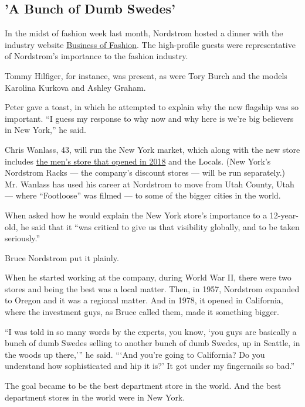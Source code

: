 \hypertarget{a-bunch-of-dumb-swedes}{%
\subsection{'A Bunch of Dumb Swedes'}\label{a-bunch-of-dumb-swedes}}

In the midst of fashion week last month, Nordstrom hosted a dinner with
the industry website
\href{https://www.nytimes3xbfgragh.onion/2014/10/12/fashion/editor-of-the-business-of-fashion-Imran-Amed-a-Front-Row-Fixture.html}{Business
of Fashion}. The high-profile guests were representative of Nordstrom's
importance to the fashion industry.

Tommy Hilfiger, for instance, was present, as were Tory Burch and the
models Karolina Kurkova and Ashley Graham.

Peter gave a toast, in which he attempted to explain why the new
flagship was so important. ``I guess my response to why now and why here
is we're big believers in New York,'' he said.

Chris Wanlass, 43, will run the New York market, which along with the
new store includes
\href{https://www.nytimes3xbfgragh.onion/2018/04/08/business/nordstrom-new-york-store.html}{the
men's store that opened in 2018} and the Locals. (New York's Nordstrom
Racks --- the company's discount stores --- will be run separately.) Mr.
Wanlass has used his career at Nordstrom to move from Utah County, Utah
--- where ``Footloose'' was filmed --- to some of the bigger cities in
the world.

When asked how he would explain the New York store's importance to a
12-year-old, he said that it ``was critical to give us that visibility
globally, and to be taken seriously.''

Bruce Nordstrom put it plainly.

When he started working at the company, during World War II, there were
two stores and being the best was a local matter. Then, in 1957,
Nordstrom expanded to Oregon and it was a regional matter. And in 1978,
it opened in California, where the investment guys, as Bruce called
them, made it something bigger.

``I was told in so many words by the experts, you know, `you guys are
basically a bunch of dumb Swedes selling to another bunch of dumb
Swedes, up in Seattle, in the woods up there,''' he said. ```And you're
going to California? Do you understand how sophisticated and hip it is?'
It got under my fingernails so bad.''

The goal became to be the best department store in the world. And the
best department stores in the world were in New York.

